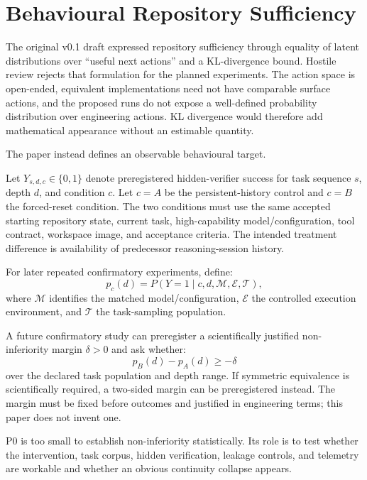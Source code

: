 \section{Behavioural Repository Sufficiency}
\label{sec:sufficiency}

The original v0.1 draft expressed repository sufficiency through equality of latent distributions over “useful next actions” and a KL-divergence bound. Hostile review rejects that formulation for the planned experiments. The action space is open-ended, equivalent implementations need not have comparable surface actions, and the proposed runs do not expose a well-defined probability distribution over engineering actions. KL divergence would therefore add mathematical appearance without an estimable quantity.

The paper instead defines an observable behavioural target.

Let $Y_{s,d,c}\in\{0,1\}$ denote preregistered hidden-verifier success for task sequence $s$, depth $d$, and condition $c$. Let $c=A$ be the persistent-history control and $c=B$ the forced-reset condition. The two conditions must use the same accepted starting repository state, current task, high-capability model/configuration, tool contract, workspace image, and acceptance criteria. The intended treatment difference is availability of predecessor reasoning-session history.

For later repeated confirmatory experiments, define:
\begin{equation}
p_c(d)=P(Y=1\mid c,d,\mathcal{M},\mathcal{E},\mathcal{T}),
\label{eq:behavioural-success}
\end{equation}
where $\mathcal{M}$ identifies the matched model/configuration, $\mathcal{E}$ the controlled execution environment, and $\mathcal{T}$ the task-sampling population.

A future confirmatory study can preregister a scientifically justified non-inferiority margin $\delta>0$ and ask whether:
\begin{equation}
p_B(d)-p_A(d) \ge -\delta
\label{eq:noninferiority-target}
\end{equation}
over the declared task population and depth range. If symmetric equivalence is scientifically required, a two-sided margin can be preregistered instead. The margin must be fixed before outcomes and justified in engineering terms; this paper does not invent one.

P0 is too small to establish non-inferiority statistically. Its role is to test whether the intervention, task corpus, hidden verification, leakage controls, and telemetry are workable and whether an obvious continuity collapse appears.

